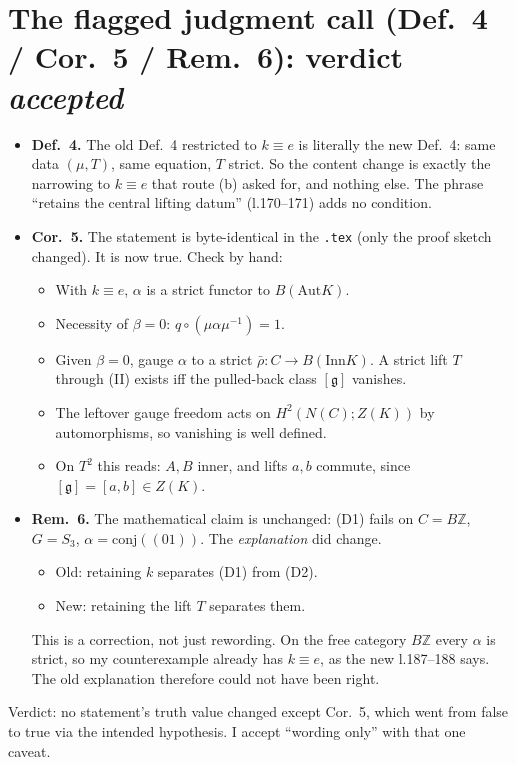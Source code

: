 \documentclass[10pt]{article}
\newcommand{\Aut}{\mathrm{Aut}}
\newcommand{\Inn}{\mathrm{Inn}}
\begin{document}
\section{The flagged judgment call (Def.~4 / Cor.~5 / Rem.~6): verdict \emph{accepted}}
\begin{itemize}
\item \textbf{Def.~4.} The old Def.~4 restricted to $k\equiv e$ is literally the new Def.~4: same data $(\mu,T)$, same equation, $T$ strict. So the content change is exactly the narrowing to $k\equiv e$ that route (b) asked for, and nothing else. The phrase ``retains the central lifting datum'' (l.170--171) adds no condition.
\item \textbf{Cor.~5.} The statement is byte-identical in the \texttt{.tex} (only the proof sketch changed). It is now true. Check by hand:
  \begin{itemize}
  \item With $k\equiv e$, $\alpha$ is a strict functor to $B(\Aut K)$.
  \item Necessity of $\beta=0$: $q\circ(\mu\alpha\mu^{-1})=1$.
  \item Given $\beta=0$, gauge $\alpha$ to a strict $\bar\rho\colon C\to B(\Inn K)$. A strict lift $T$ through (II) exists iff the pulled-back class $[\mathfrak g]$ vanishes.
  \item The leftover gauge freedom acts on $H^2(N(C);Z(K))$ by automorphisms, so vanishing is well defined.
  \item On $T^2$ this reads: $A,B$ inner, and lifts $a,b$ commute, since $[\mathfrak g]=[a,b]\in Z(K)$.
  \end{itemize}
\item \textbf{Rem.~6.} The mathematical claim is unchanged: (D1) fails on $C=B\mathbb Z$, $G=S_3$, $\alpha=\mathrm{conj}((01))$. The \emph{explanation} did change.
  \begin{itemize}
  \item Old: retaining $k$ separates (D1) from (D2).
  \item New: retaining the lift $T$ separates them.
  \end{itemize}
  This is a correction, not just rewording. On the free category $B\mathbb Z$ every $\alpha$ is strict, so my counterexample already has $k\equiv e$, as the new l.187--188 says. The old explanation therefore could not have been right.
\end{itemize}
Verdict: no statement's truth value changed except Cor.~5, which went from false to true via the intended hypothesis. I accept ``wording only'' with that one caveat.
\end{document}
